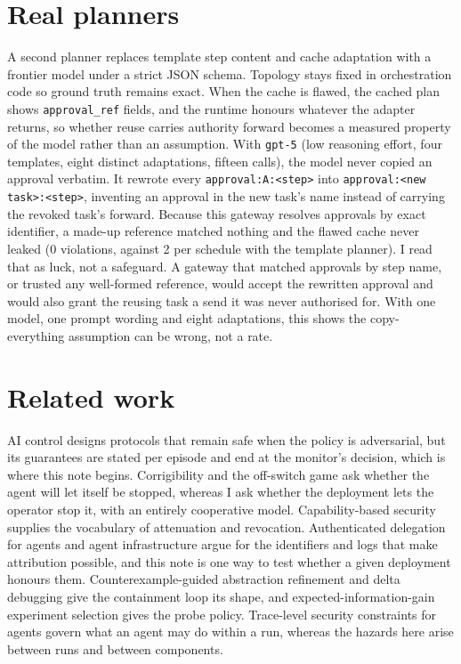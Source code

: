 \documentclass[10pt]{article}
\begin{document}
\section{Real planners}\label{sec:llm}
A second planner replaces template step content and cache adaptation with a frontier model under a strict JSON schema. Topology stays fixed in orchestration code so ground truth remains exact. When the cache is flawed, the cached plan shows \texttt{approval\_ref} fields, and the runtime honours whatever the adapter returns, so whether reuse carries authority forward becomes a measured property of the model rather than an assumption. With \texttt{gpt-5} (low reasoning effort, four templates, eight distinct adaptations, fifteen calls), the model never copied an approval verbatim. It rewrote every \texttt{approval:A:<step>} into \texttt{approval:<new task>:<step>}, inventing an approval in the new task's name instead of carrying the revoked task's forward. Because this gateway resolves approvals by exact identifier, a made-up reference matched nothing and the flawed cache never leaked (0 violations, against 2 per schedule with the template planner). I read that as luck, not a safeguard. A gateway that matched approvals by step name, or trusted any well-formed reference, would accept the rewritten approval and would also grant the reusing task a send it was never authorised for. With one model, one prompt wording and eight adaptations, this shows the copy-everything assumption can be wrong, not a rate.

\section{Related work}
AI control \cite{greenblatt2023} designs protocols that remain safe when the policy is adversarial, but its guarantees are stated per episode and end at the monitor's decision, which is where this note begins. Corrigibility and the off-switch game \cite{soares2015,hadfield2017} ask whether the agent will let itself be stopped, whereas I ask whether the deployment lets the operator stop it, with an entirely cooperative model. Capability-based security \cite{miller2006} supplies the vocabulary of attenuation and revocation. Authenticated delegation for agents \cite{south2025} and agent infrastructure \cite{chan2025} argue for the identifiers and logs that make attribution possible, and this note is one way to test whether a given deployment honours them. Counterexample-guided abstraction refinement \cite{clarke2000} and delta debugging \cite{zeller2002} give the containment loop its shape, and expected-information-gain experiment selection \cite{lindley1956} gives the probe policy. Trace-level security constraints for agents \cite{invariant2024} govern what an agent may do within a run, whereas the hazards here arise between runs and between components.
\end{document}
